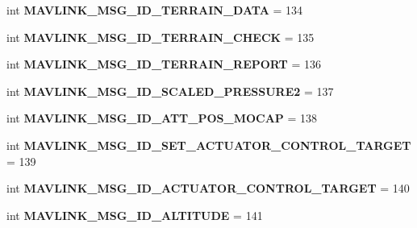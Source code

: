 \begin{DoxyCompactItemize}
int {\bfseries M\+A\+V\+L\+I\+N\+K\+\_\+\+M\+S\+G\+\_\+\+I\+D\+\_\+\+T\+E\+R\+R\+A\+I\+N\+\_\+\+D\+A\+TA} = 134
\item 
\mbox{\label{namespacepymavlink_1_1dialects_1_1v10_ace93a7dcd50e7d36d53c2f9cadda1ee8}} 
int {\bfseries M\+A\+V\+L\+I\+N\+K\+\_\+\+M\+S\+G\+\_\+\+I\+D\+\_\+\+T\+E\+R\+R\+A\+I\+N\+\_\+\+C\+H\+E\+CK} = 135
\item 
\mbox{\label{namespacepymavlink_1_1dialects_1_1v10_a64e77abe25231a7bad352ca6d1d06ee6}} 
int {\bfseries M\+A\+V\+L\+I\+N\+K\+\_\+\+M\+S\+G\+\_\+\+I\+D\+\_\+\+T\+E\+R\+R\+A\+I\+N\+\_\+\+R\+E\+P\+O\+RT} = 136
\item 
\mbox{\label{namespacepymavlink_1_1dialects_1_1v10_a102356edb6d135ba6ffda8e78552a3d9}} 
int {\bfseries M\+A\+V\+L\+I\+N\+K\+\_\+\+M\+S\+G\+\_\+\+I\+D\+\_\+\+S\+C\+A\+L\+E\+D\+\_\+\+P\+R\+E\+S\+S\+U\+R\+E2} = 137
\item 
\mbox{\label{namespacepymavlink_1_1dialects_1_1v10_a60e974f72269fb06f99d950f0418ff63}} 
int {\bfseries M\+A\+V\+L\+I\+N\+K\+\_\+\+M\+S\+G\+\_\+\+I\+D\+\_\+\+A\+T\+T\+\_\+\+P\+O\+S\+\_\+\+M\+O\+C\+AP} = 138
\item 
\mbox{\label{namespacepymavlink_1_1dialects_1_1v10_a60cae8375a774502d32e0365e68c48cd}} 
int {\bfseries M\+A\+V\+L\+I\+N\+K\+\_\+\+M\+S\+G\+\_\+\+I\+D\+\_\+\+S\+E\+T\+\_\+\+A\+C\+T\+U\+A\+T\+O\+R\+\_\+\+C\+O\+N\+T\+R\+O\+L\+\_\+\+T\+A\+R\+G\+ET} = 139
\item 
\mbox{\label{namespacepymavlink_1_1dialects_1_1v10_ae466a4222e888f50a3a9133322a0d3af}} 
int {\bfseries M\+A\+V\+L\+I\+N\+K\+\_\+\+M\+S\+G\+\_\+\+I\+D\+\_\+\+A\+C\+T\+U\+A\+T\+O\+R\+\_\+\+C\+O\+N\+T\+R\+O\+L\+\_\+\+T\+A\+R\+G\+ET} = 140
\item 
\mbox{\label{namespacepymavlink_1_1dialects_1_1v10_a238210159953afc92d231822eb6f31ed}} 
int {\bfseries M\+A\+V\+L\+I\+N\+K\+\_\+\+M\+S\+G\+\_\+\+I\+D\+\_\+\+A\+L\+T\+I\+T\+U\+DE} = 141
\item 
\mbox{\label{namespacepymavlink_1_1dialects_1_1v10_ab08460402dfdb5b859833bb67213acdd}} 

\end{DoxyCompactItemize}
